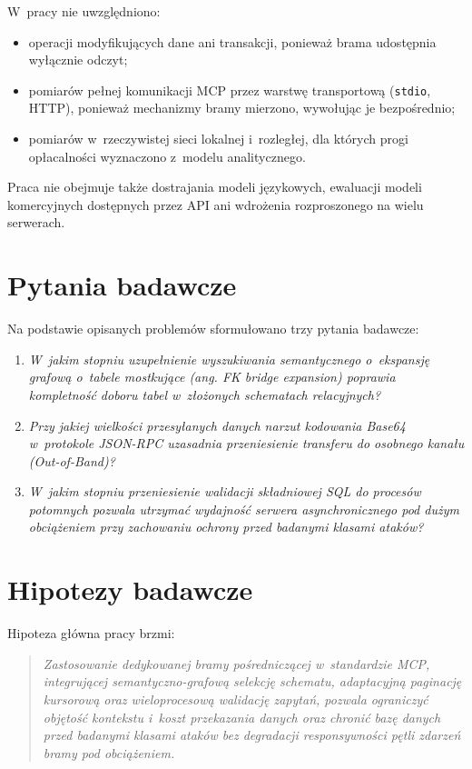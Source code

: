 W~pracy nie uwzględniono:
\begin{itemize}
    \item operacji modyfikujących dane ani transakcji, ponieważ brama udostępnia wyłącznie odczyt;
    \item pomiarów pełnej komunikacji MCP przez warstwę transportową (\texttt{stdio}, HTTP), ponieważ mechanizmy bramy mierzono, wywołując je bezpośrednio;
    \item pomiarów w~rzeczywistej sieci lokalnej i~rozległej, dla których progi opłacalności wyznaczono z~modelu analitycznego.
\end{itemize}
Praca nie obejmuje także dostrajania modeli językowych, ewaluacji modeli komercyjnych dostępnych przez API ani wdrożenia rozproszonego na wielu serwerach.


\section{Pytania badawcze}
\label{sec:wstep_rq}

Na podstawie opisanych problemów sformułowano trzy pytania badawcze:
\begin{enumerate}
    \item[\textbf{PB1}] \emph{W~jakim stopniu uzupełnienie wyszukiwania semantycznego o~ekspansję grafową o~tabele mostkujące (ang. \emph{FK bridge expansion}) poprawia kompletność doboru tabel w~złożonych schematach relacyjnych?}
    \item[\textbf{PB2}] \emph{Przy jakiej wielkości przesyłanych danych narzut kodowania Base64 w~protokole JSON-RPC uzasadnia przeniesienie transferu do osobnego kanału (Out-of-Band)?}
    \item[\textbf{PB3}] \emph{W~jakim stopniu przeniesienie walidacji składniowej SQL do procesów potomnych pozwala utrzymać wydajność serwera asynchronicznego pod dużym obciążeniem przy zachowaniu ochrony przed badanymi klasami ataków?}
\end{enumerate}


\section{Hipotezy badawcze}
\label{sec:wstep_hipoteza}

Hipoteza główna pracy brzmi:

\begin{quote}
\textit{Zastosowanie dedykowanej bramy pośredniczącej w~standardzie MCP, integrującej semantyczno-grafową selekcję schematu, adaptacyjną paginację kursorową oraz wieloprocesową walidację zapytań, pozwala ograniczyć objętość kontekstu i~koszt przekazania danych oraz chronić bazę danych przed badanymi klasami ataków bez degradacji responsywności pętli zdarzeń bramy pod obciążeniem.}
\end{quote}


